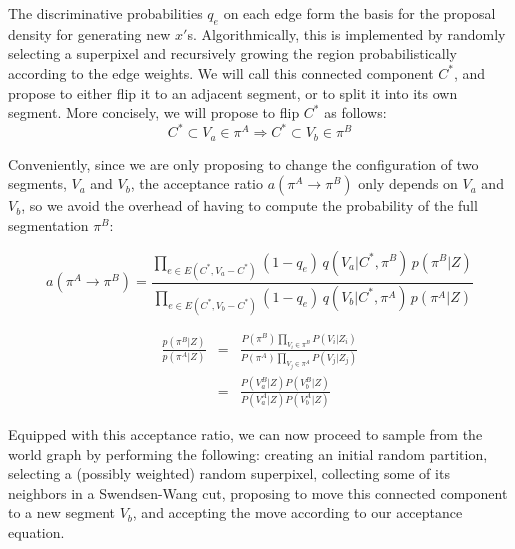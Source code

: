 \documentclass[10pt,letterpaper]{article}
\begin{document}
	The discriminative probabilities $q_e$ on each edge form the basis for the proposal density for generating new $x'$s. Algorithmically, this is implemented by randomly selecting a superpixel and recursively growing the region probabilistically according to the edge weights. We will call this connected component $C^*$, and propose to either flip it to an adjacent segment, or to split it into its own segment. More concisely, we will propose to flip $C^*$ as follows: 
\begin{equation}
C^*\subset V_a \in \pi^A \Rightarrow C^*\subset V_b \in \pi^B
\end{equation}
	
	Conveniently, since we are only proposing to change the configuration of two segments, $V_a$ and $V_b$, the acceptance ratio $a(\pi^{A}\rightarrow \pi^{B})$ only depends on $V_a$ and $V_b$, so we avoid the overhead of having to compute the probability of the full segmentation $\pi^B$:

\begin{equation}
a(\pi^{A}\rightarrow \pi^{B})=\frac{\prod_{e\in E(C^{*},V_{a}-C^{*})}(1-q_{e})\, q(V_{a}|C^{*},\pi^{B})\, p(\pi^{B}|Z)}{\prod_{e\in E(C^{*},V_{b}-C^{*})}(1-q_{e})\, q(V_{b}|C^{*},\pi^{A})\, p(\pi^{A}|Z)}\label{eq: acceptanceRatio}
\end{equation}

\begin{eqnarray}
\frac{p(\pi^{B}|Z)}{p(\pi^{A}|Z)} & = & \frac{P(\pi^{B})\prod_{V_{i}\in \pi^{B}}P(V_{i}|Z_{i})}{P(\pi^{A})\prod_{V_{j}\in \pi^{A}}P(V_{j}|Z_{j})}\nonumber \\
 & = & \frac{P(V_{a}^{B}|Z)P(V_{b}^{B}|Z)}{P(V_{a}^{A}|Z)P(V_{b}^{A}|Z)}\label{eq:jumpProb}
\end{eqnarray}

	Equipped with this acceptance ratio, we can now proceed to sample from the world graph by performing the following: creating an initial random partition, selecting a (possibly weighted) random superpixel, collecting some of its neighbors in a Swendsen-Wang cut, proposing to move this connected component to a new segment $V_b$, and accepting the move according to our acceptance equation.


%
\end{document}
